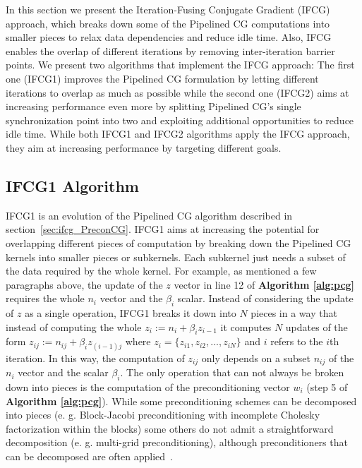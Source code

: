 In this section we present the Iteration-Fusing Conjugate Gradient (IFCG) approach, 
which breaks down some of the Pipelined CG computations into smaller pieces to relax data dependencies and reduce idle time.
Also, IFCG enables the overlap of different iterations by removing inter-iteration barrier points.
We present two algorithms that implement the IFCG approach: 
The first one (IFCG1) improves the Pipelined CG formulation by letting different iterations to overlap as much as possible while the second one (IFCG2) aims at increasing performance even more by splitting Pipelined CG's single synchronization point into two and exploiting additional opportunities to reduce idle time.
While both IFCG1 and IFCG2 algorithms apply the IFCG approach, they aim at increasing performance by targeting different goals.
 
\subsection{IFCG1 Algorithm}
IFCG1 is an evolution of the Pipelined CG algorithm described in section~\ref{sec:ifcg_PreconCG}. 
IFCG1 aims at increasing the potential for overlapping different pieces of computation by breaking down the Pipelined CG kernels into smaller pieces or subkernels.
Each subkernel just needs a subset of the data required by the whole kernel.
For example, as mentioned a few paragraphs above, the update of the $z$ vector in line 12 of \textbf{Algorithm \ref{alg:pcg}} requires the whole $n_i$ vector and the $\beta_{i}$ scalar.
Instead of considering the update of $z$ as a single operation, IFCG1 breaks it down into $N$ pieces in a way that instead of computing the whole $z_{i} := n_{i} + \beta_{i}z_{i-1}$ it computes $N$
updates of the form $z_{ij} := n_{ij} + \beta_{i}z_{(i-1)j}$ where $z_i = \{z_{i1}, z_{i2}, ..., z_{iN}\}$ and $i$ refers to the $i$th iteration.
In this way, the computation of $z_{ij}$ only depends on a subset $n_{ij}$ of the $n_i$ vector and the scalar $\beta_i$.
The only operation that can not always be broken down into pieces is the computation of the preconditioning vector $w_i$ (step 5 of \textbf{Algorithm \ref{alg:pcg}}). 
While some preconditioning schemes can be decomposed into pieces (e. g. Block-Jacobi preconditioning with incomplete Cholesky factorization within the blocks) some others do not admit a straightforward decomposition (e. g. multi-grid preconditioning), 
although preconditioners that can be decomposed are often applied~\cite{ghysels14}.

